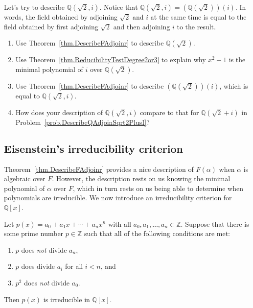 \begin{problem}
Let's try to describe $\mathbb{Q}(\sqrt{2},i)$. Notice that $\mathbb{Q}(\sqrt{2},i) = \left(\mathbb{Q}(\sqrt{2})\right)(i)$. In words, the field obtained by adjoining $\sqrt{2} $ and $i$ at the same time is equal to the field obtained by first adjoining $\sqrt{2}$ and then adjoining $i$ to the result.
\begin{enumerate}
\item Use  Theorem~\ref{thm.DescribeFAdjoinr} to describe $\mathbb{Q}(\sqrt{2})$.
\item Use Theorem~\ref{thm.ReducibilityTestDegree2or3} to explain why $x^2+1$ is the minimal polynomial of $i$ over $\mathbb{Q}(\sqrt{2})$.
\item Use  Theorem~\ref{thm.DescribeFAdjoinr} to describe $\left(\mathbb{Q}(\sqrt{2})\right)(i)$, which is equal to $\mathbb{Q}(\sqrt{2},i)$.
\item How does your description of $\mathbb{Q}(\sqrt{2},i)$ compare to that for $\mathbb{Q}(\sqrt{2} + i)$ in Problem~\ref{prob.DescribeQAdjoinSqrt2PlusI}?
\end{enumerate}
\end{problem}


\subsection{Eisenstein's irreducibility criterion}

Theorem~\ref{thm.DescribeFAdjoinr} provides a nice description of $F(\alpha)$ when $\alpha$ is algebraic over $F$. However, the description rests on us knowing the minimal polynomial of $\alpha$ over $F$, which in turn rests on us being able to determine when polynomials are irreducible. We now introduce an irreducibility criterion for $\mathbb{Q}[x]$.

\begin{fact}\label{fact.Eisenstein}
Let $p(x) = a_0 + a_1x + \cdots + a_nx^n$ with all $a_0,a_1,\ldots,a_n \in \mathbb{Z}$. Suppose that there is some prime number $p \in \mathbb{Z}$ such that all of the following conditions are met:
\begin{enumerate}
\item $p$ does \emph{not} divide $a_n$,
\item $p$ does divide $a_i$ for all $i<n$, and
\item $p^2$ does \emph{not} divide $a_0$.
\end{enumerate}
Then $p(x)$ is irreducible in $\mathbb{Q}[x]$.
\end{fact}

